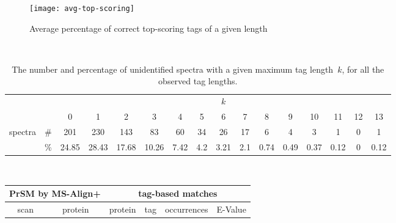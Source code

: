 \documentclass{article}[12pt]
\begin{document}
\begin{figure}
  \begin{center}
\texttt{[image: avg-top-scoring]}
\end{center}
\caption{Average percentage of correct top-scoring tags of a given length}
  \label{fig:avg-top-scoring}
\end{figure}





\begin{landscape}

\begin{table}[h]
\vspace{3mm}\
{\centering
\begin{center}
\begin{tabular}{|c|c|
c|c|c|c|c|c|c|c|c|c|c|c|c|c|}
  \hline
  \multicolumn{2}{|c|}{} & \multicolumn{ 14}{|c|}{$k$} \\
  \cline{3-16}
  \multicolumn{2}{|c|}{} 
 & 0 & 1 & 2 & 3 & 4 & 5 & 6 & 7 & 8 & 9 & 10 & 11 & 12 & 13\\
  \hline
  \multirow{2}{*}{spectra} & \#
 & 201 & 230 & 143 & 83 & 60 & 34 & 26 & 17 & 6 & 4 & 3 & 1 & 0 & 1\\
   & \%
 & 24.85 & 28.43 & 17.68 & 10.26 & 7.42 & 4.2 & 3.21 & 2.1 & 0.74 & 0.49 & 0.37 & 0.12 & 0 & 0.12\\
  \hline
\end{tabular}
\end{center}
\par}
\centering
\caption{The number and percentage of unidentified spectra with a given maximum tag length~$k$, for all the observed tag lengths.}
\vspace{3mm}
\label{table:unident-tags}
\end{table}


\begin{table}[h]\footnotesize
\vspace{3mm}\
{\centering
\begin{center}
\begin{tabular}{|c|c||c|c|c|c|}
  \hline
  \multicolumn{2}{|c||}{PrSM by MS-Align+} & \multicolumn{4}{|c|}{tag-based matches} \\
  \hline
  scan & protein & protein & tag & occurrences & E-Value\\


\end{tabular}
\end{center}}
\end{table}
\end{landscape}
\end{document}
